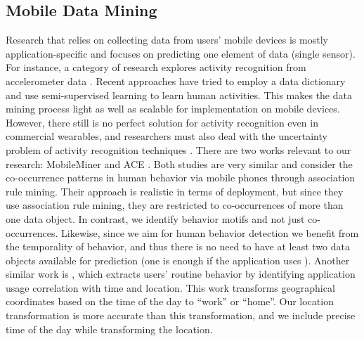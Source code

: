 \documentclass{sig-alternate}
\begin{document}
\subsection{Mobile Data Mining}
Research that relies on collecting data from users' mobile devices is mostly application-specific and focuses on predicting one element of data (single sensor). For instance, a category of research explores activity recognition from accelerometer data \cite{unlabelsparse, activitytaxonomy, genmodautrec}. Recent approaches \cite{unlabelsparse} have tried to employ a data dictionary and use semi-supervised learning to learn human activities. This makes the data mining process light  as well as scalable for implementation on mobile devices. However, there still is no perfect solution for activity recognition even in commercial wearables, and researchers must also deal with the uncertainty problem of activity recognition techniques \cite{validity}. There are two works relevant to our research: MobileMiner \cite{mobileminer} and ACE \cite{ace}. Both studies are very similar and consider the co-occurrence patterns in human behavior via mobile phones through association rule mining. Their approach is realistic in terms of deployment, but since they use association rule mining, they are restricted to co-occurrences of more than one data object. In contrast, we identify behavior motifs and not just co-occurrences. Likewise, since we aim for human behavior detection we benefit from the temporality of behavior, and thus there is no need to have at least two data objects available for prediction (one is enough if the application uses  ). Another similar work is \cite{habitmin}, which extracts users' routine behavior by identifying application usage correlation with time and location. This work transforms geographical coordinates based on the time of the day to ``work'' or ``home''. Our location transformation is more accurate than this transformation, and we include precise time of the day while transforming the location.
\vspace{-0.1cm}
\end{document}
